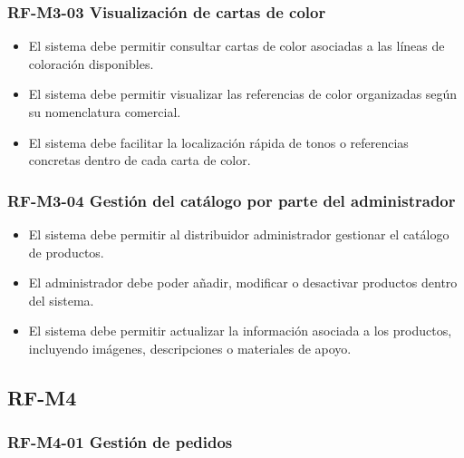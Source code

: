 \vspace{-0.75em}
\subsubsection{RF-M3-03 Visualización de cartas de color}
\vspace{-1em}

\begin{itemize}
    \item El sistema debe permitir consultar cartas de color asociadas a las líneas de coloración disponibles.
    \item El sistema debe permitir visualizar las referencias de color organizadas según su nomenclatura comercial.
    \item El sistema debe facilitar la localización rápida de tonos o referencias concretas dentro de cada carta de color.
\end{itemize}

\vspace{-0.75em}
\subsubsection{RF-M3-04 Gestión del catálogo por parte del administrador}
\vspace{-1em}

\begin{itemize}
    \item El sistema debe permitir al distribuidor administrador gestionar el catálogo de productos.
    \item El administrador debe poder añadir, modificar o desactivar productos dentro del sistema.
    \item El sistema debe permitir actualizar la información asociada a los productos, incluyendo imágenes, descripciones o materiales de apoyo.
\end{itemize}

\subsection{RF-M4}

\vspace{-0.75em}
\subsubsection{RF-M4-01 Gestión de pedidos}
\vspace{-1em}

